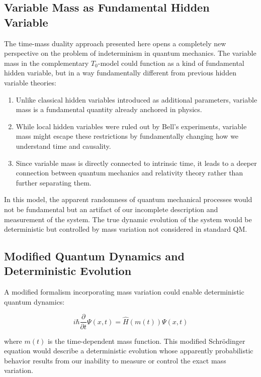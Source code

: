 \documentclass[12pt,a4paper]{article}  %
\begin{document}
	\subsection{Variable Mass as Fundamental Hidden Variable}
	
	The time-mass duality approach presented here opens a completely new perspective on the problem of indeterminism in quantum mechanics. The variable mass in the complementary $T_0$-model could function as a kind of fundamental hidden variable, but in a way fundamentally different from previous hidden variable theories:
	
	\begin{enumerate}
		\item Unlike classical hidden variables introduced as additional parameters, variable mass is a fundamental quantity already anchored in physics.
		
		\item While local hidden variables were ruled out by Bell's experiments, variable mass might escape these restrictions by fundamentally changing how we understand time and causality.
		
		\item Since variable mass is directly connected to intrinsic time, it leads to a deeper connection between quantum mechanics and relativity theory rather than further separating them.
	\end{enumerate}
	
	In this model, the apparent randomness of quantum mechanical processes would not be fundamental but an artifact of our incomplete description and measurement of the system. The true dynamic evolution of the system would be deterministic but controlled by mass variation not considered in standard QM.
	
	\subsection{Modified Quantum Dynamics and Deterministic Evolution}
	
	A modified formalism incorporating mass variation could enable deterministic quantum dynamics:
	
	\begin{equation}
		i\hbar \frac{\partial}{\partial t}\Psi(x,t) = \hat{H}(m(t))\Psi(x,t)
	\end{equation}
	
	where $m(t)$ is the time-dependent mass function. This modified Schrödinger equation would describe a deterministic evolution whose apparently probabilistic behavior results from our inability to measure or control the exact mass variation.
	
\end{document}
